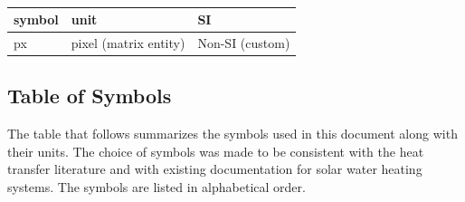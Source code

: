 \documentclass[12pt]{article}
\begin{document}
~\newline

\renewcommand{\arraystretch}{1.2}
\begin{table}[ht]
  \noindent \begin{tabular}{l l l} 
    \toprule		
    \textbf{symbol} & \textbf{unit} & \textbf{SI}\\
    \midrule 
    px & pixel (matrix entity) & 	Non-SI (custom)\\
    \bottomrule
  \end{tabular}
\end{table}




\subsection{Table of Symbols}

The table that follows summarizes the symbols used in this document along with
their units.  The choice of symbols was made to be consistent with the heat
transfer literature and with existing documentation for solar water heating
systems.  The symbols are listed in alphabetical order.
\end{document}
